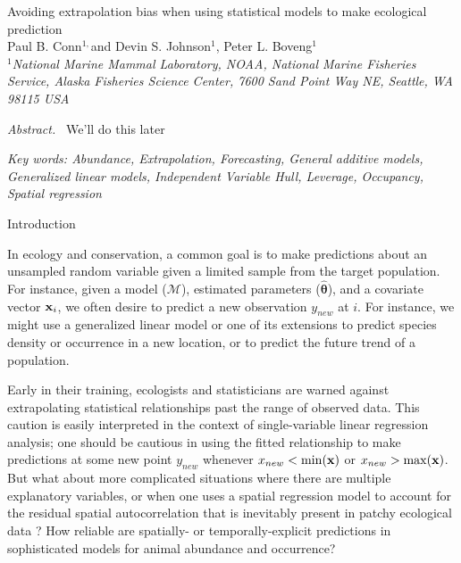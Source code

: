 \documentclass[12pt,english]{article}
\begin{document}
\begin{spacing}{1.9}

\begin{center}
Avoiding extrapolation bias when using statistical models to make ecological prediction
\bigskip\\
\normalsize
{\sc Paul B. Conn$^{1,}$\footnotemark[2] and
Devin S. Johnson$^1$, Peter L. Boveng$^1$ }\smallskip\\
$^1${\em National Marine Mammal Laboratory, NOAA, National Marine Fisheries Service,
Alaska Fisheries Science Center, 7600 Sand Point Way NE, Seattle,
WA 98115 USA }\\ \medskip
\end{center}


\raggedright \setlength{\parindent}{0.3in}
{}
 \linenumbers


{\em Abstract.\ } We'll do this later



{\em Key words: Abundance, Extrapolation, Forecasting, General additive models, Generalized linear models, Independent Variable Hull, Leverage, Occupancy, Spatial regression}

\centerline{\sc Introduction}


In ecology and conservation, a common goal is to make predictions about an unsampled random variable given a limited sample from the target population.  For instance, given a model ($\mathcal{M}$), estimated parameters ($\hat{\boldsymbol{\theta}}$), and a covariate vector ${\bf x}_i$, we often desire to predict a new observation $y_{new}$ at $i$.  For instance, we might use a generalized linear model \citep{McCullaghNelder1989} or one of its extensions to predict species density or occurrence in a new location, or to predict the future trend of a population.

Early in their training, ecologists and statisticians are warned against extrapolating statistical relationships
past the range of observed data.  This caution is easily interpreted in the context of single-variable linear regression analysis; one should be cautious in using the fitted relationship to make predictions at some new point $y_{new}$ whenever $x_{new} < \min({\bf x})$ or $x_{new} > \max({\bf x})$.  But what about more complicated situations
where there are multiple explanatory variables, or when one uses a spatial regression model to account for the residual spatial autocorrelation that is inevitably present in patchy ecological data \citep{LichsteinEtAl2002}?  How reliable are spatially- or temporally-explicit predictions in sophisticated models for animal abundance and occurrence?


\end{spacing}
\end{document}
